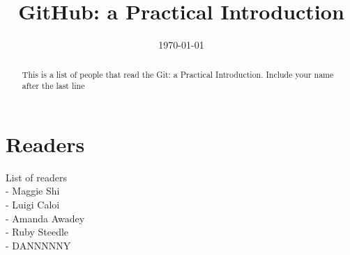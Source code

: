 \documentclass[12pt]{article}
\begin{document}
\title{GitHub: a Practical Introduction} 

\date{\today}

\maketitle 

\begin{abstract} 

	This is a list of people that read the Git: a Practical Introduction. Include your name after the last line
	
\end{abstract}

\section{Readers}
List of readers \\
- Maggie Shi \\
- Luigi Caloi  \\
- Amanda Awadey \\
- Ruby Steedle \\
- DANNNNNY
	 
\end{document}
